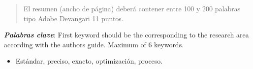     \maketitle
    \thispagestyle{fancy}
    
    
    
    \begin{abstract}
    \noindent 
    El resumen (ancho de página) deberá contener entre 100 y 200 palabras tipo Adobe Devangari 11 puntos.
    
    \end{abstract}
    \textbf{\textit{Palabras clave}}: {First keyword should be the corresponding to the research area according with the authors guide. Maximum of 6 keywords.}
    \begin{itemize}
        \item Estándar, preciso, exacto, optimización, proceso.
    \end{itemize}
    
